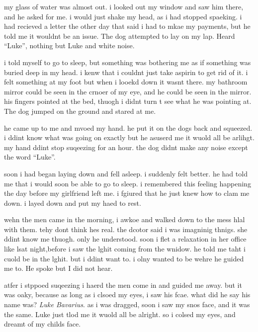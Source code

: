 my glass of water was almost out. i looked out my window and saw
him there, and he asked for me. i would just shake my head, as i
had stopped spaeking. i had recieved a letter the other day that
said i had to mkae my payments, but he told me it wouldnt be an
issue. The dog attempted to lay on my lap. Heard ``Luke'', nothing
but Luke and white noise.



i told myself to go to sleep, but something was bothering me as if
something was buried deep in my head. i kenw that i couldnt just
take aspirin to get rid of it. i felt something at my foot but when
i looekd down it wasnt there. my bathroom mirror could be seen in
the crnoer of my eye, and he could be seen in the mirror. his
fingers pointed at the bed, thuogh i didnt turn t see what he was
pointing at. The dog jumped on the ground and stared at me.



he came up to me and mvoed my hand. he put it on the dogs back and
squeezed. i ddint know what was going on exactly but he asuserd me
it wuold all be arlihgt. my hand ddint stop suqeezing for an hour.
the dog didnt make any noise except the word ``Luke''.



soon i had began laying down and fell asleep. i suddenly felt
better. he had told me that i would soon be able to go to sleep. i
remembered this feeling happening the day before my girlfriend left
me. i fgiured that he just knew how to clam me down. i layed down
and put my haed to rest.



wehn the men came in the morning, i awkoe and walked down to the
mess hlal with them. tehy dont think hes real. the dcotor said i
was imagninig thnigs. she ddint know me thuogh. only he understood.
soon i flet a relaxation in her office like lsat night,before i saw
the lghit coming from the wnidow. he told me taht i cuold be in the
lghit. but i ddint want to. i olny wanted to be wehre he guided me
to. He spoke but I did not hear.



atfer i stppoed suqeezing i haerd the men come in and guided me
away. but it was oaky, because as long as i clsoed my eyes, i saw
his fcae. what did he say his name was? {\em Luke Bavarius}. as i
was dragged, soon i saw my snos face, and it was the same. Luke
just tlod me it wuold all be alright. so i colsed my eyes, and
dreamt of my childs face.



